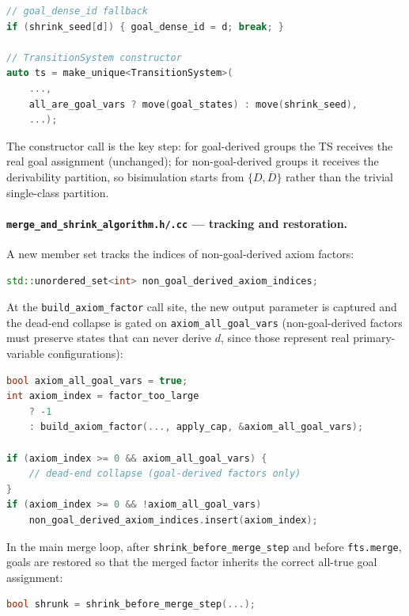 \documentclass[11pt,a4paper]{article}
\begin{document}
\begin{enumerate}
\begin{lstlisting}[language=C++]
// goal_dense_id fallback
if (shrink_seed[d]) { goal_dense_id = d; break; }

// TransitionSystem constructor
auto ts = make_unique<TransitionSystem>(
    ...,
    all_are_goal_vars ? move(goal_states) : move(shrink_seed),
    ...);
    \end{lstlisting}

    The constructor call is the key step: for goal-derived groups the TS
    receives the real goal assignment (unchanged); for non-goal-derived groups
    it receives the derivability partition, so bisimulation starts from
    $\{D, \overline{D}\}$ rather than the trivial single-class partition.

    \paragraph{\texttt{merge\_and\_shrink\_algorithm.h/.cc} --- tracking and restoration.}

    A new member set tracks the indices of non-goal-derived axiom factors:
    \begin{lstlisting}[language=C++]
std::unordered_set<int> non_goal_derived_axiom_indices;
    \end{lstlisting}

    At the \texttt{build\_axiom\_factor} call site, the new output parameter
    is captured and the dead-end collapse is gated on \texttt{axiom\_all\_goal\_vars}
    (non-goal-derived factors must preserve states that can never derive $d$,
    since those represent real primary-variable configurations):

    \begin{lstlisting}[language=C++]
bool axiom_all_goal_vars = true;
int axiom_index = factor_too_large
    ? -1
    : build_axiom_factor(..., apply_cap, &axiom_all_goal_vars);

if (axiom_index >= 0 && axiom_all_goal_vars) {
    // dead-end collapse (goal-derived factors only)
}
if (axiom_index >= 0 && !axiom_all_goal_vars)
    non_goal_derived_axiom_indices.insert(axiom_index);
    \end{lstlisting}

    In the main merge loop, after \texttt{shrink\_before\_merge\_step} and
    before \texttt{fts.merge}, goals are restored so that the merged factor
    inherits the correct all-true goal assignment:

    \begin{lstlisting}[language=C++]
bool shrunk = shrink_before_merge_step(...);


\end{lstlisting}
\end{enumerate}
\end{document}
